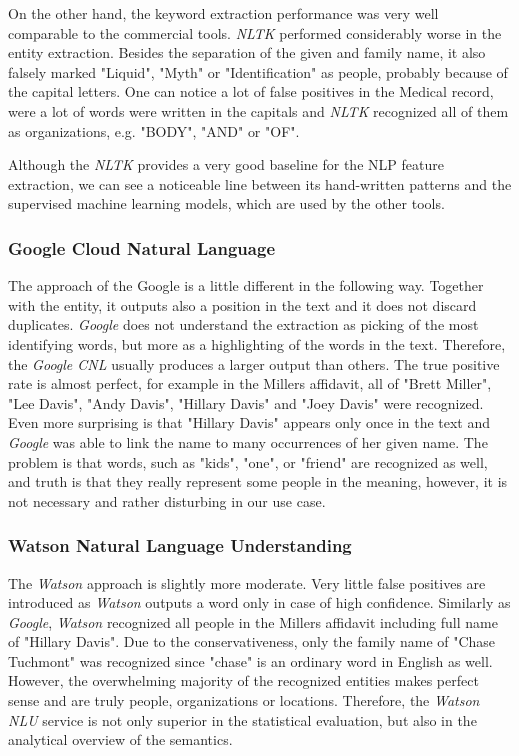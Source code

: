 \documentclass[
  digital, %
  table,   %
  lof,     %
  lot,     %
]{fithesis3}
\begin{document}
On the other hand, the keyword extraction performance was very well comparable to the commercial tools.
\textit{NLTK} performed considerably worse in the entity extraction.
Besides the separation of the given and family name, it also falsely marked "Liquid", "Myth" or "Identification" as people, probably because of the capital letters.
One can notice a lot of false positives in the Medical record, were a lot of words were written in the capitals and \textit{NLTK} recognized all of them as organizations, e.g. "BODY", "AND" or "OF".

Although the \textit{NLTK} provides a very good baseline for the NLP feature extraction, we can see a noticeable line between its hand-written patterns and the supervised machine learning models, which are used by the other tools.

\subsubsection{\textbf{Google Cloud Natural Language}}
The approach of the Google is a little different in the following way.
Together with the entity, it outputs also a position in the text and it does not discard duplicates.
\textit{Google} does not understand the extraction as picking of the most identifying words, but more as a highlighting of the words in the text.
Therefore, the \textit{Google CNL} usually produces a larger output than others.
The true positive rate is almost perfect, for example in the Millers affidavit, all of "Brett Miller", "Lee Davis", "Andy Davis", "Hillary Davis" and "Joey Davis" were recognized.
Even more surprising is that "Hillary Davis" appears only once in the text and \textit{Google} was able to link the name to many occurrences of her given name.
The problem is that words, such as "kids", "one", or "friend" are recognized as well, and truth is that they really represent some people in the meaning, however, it is not necessary and rather disturbing in our use case.

\subsubsection{\textbf{Watson Natural Language Understanding}}
The \textit{Watson} approach is slightly more moderate.
Very little false positives are introduced as \textit{Watson} outputs a word only in case of high confidence.
Similarly as \textit{Google}, \textit{Watson} recognized all people in the Millers affidavit including full name of "Hillary Davis".
Due to the conservativeness, only the family name of "Chase Tuchmont" was recognized since "chase" is an ordinary word in English as well.
However, the overwhelming majority of the recognized entities makes perfect sense and are truly people, organizations or locations.
Therefore, the \textit{Watson NLU} service is not only superior in the statistical evaluation, but also in the analytical overview of the semantics.
\end{document}
